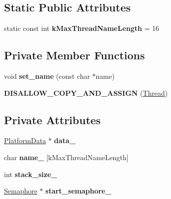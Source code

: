 \subsection*{Static Public Attributes}
\begin{DoxyCompactItemize}
\item 
static const int {\bfseries k\+Max\+Thread\+Name\+Length} = 16\hypertarget{classv8_1_1base_1_1_thread_add5f4a186f3af7d6781fb36847309e7e}{}\label{classv8_1_1base_1_1_thread_add5f4a186f3af7d6781fb36847309e7e}

\end{DoxyCompactItemize}
\subsection*{Private Member Functions}
\begin{DoxyCompactItemize}
\item 
void {\bfseries set\+\_\+name} (const char $\ast$name)\hypertarget{classv8_1_1base_1_1_thread_ac8b3808f8666e627a7b13deebd9eda15}{}\label{classv8_1_1base_1_1_thread_ac8b3808f8666e627a7b13deebd9eda15}

\item 
{\bfseries D\+I\+S\+A\+L\+L\+O\+W\+\_\+\+C\+O\+P\+Y\+\_\+\+A\+N\+D\+\_\+\+A\+S\+S\+I\+GN} (\hyperlink{classv8_1_1base_1_1_thread}{Thread})\hypertarget{classv8_1_1base_1_1_thread_a17fe31da27dc280a422c98c8f8a16e35}{}\label{classv8_1_1base_1_1_thread_a17fe31da27dc280a422c98c8f8a16e35}

\end{DoxyCompactItemize}
\subsection*{Private Attributes}
\begin{DoxyCompactItemize}
\item 
\hyperlink{classv8_1_1base_1_1_thread_1_1_platform_data}{Platform\+Data} $\ast$ {\bfseries data\+\_\+}\hypertarget{classv8_1_1base_1_1_thread_aa6959b4afc8ba7065d97e45327dc54a3}{}\label{classv8_1_1base_1_1_thread_aa6959b4afc8ba7065d97e45327dc54a3}

\item 
char {\bfseries name\+\_\+} \mbox{[}k\+Max\+Thread\+Name\+Length\mbox{]}\hypertarget{classv8_1_1base_1_1_thread_ad7bf55fcc4e796d347c59734708eb81d}{}\label{classv8_1_1base_1_1_thread_ad7bf55fcc4e796d347c59734708eb81d}

\item 
int {\bfseries stack\+\_\+size\+\_\+}\hypertarget{classv8_1_1base_1_1_thread_a223c063a84b4c9aa9a2fd7b01d480fbb}{}\label{classv8_1_1base_1_1_thread_a223c063a84b4c9aa9a2fd7b01d480fbb}

\item 
\hyperlink{classv8_1_1base_1_1_semaphore}{Semaphore} $\ast$ {\bfseries start\+\_\+semaphore\+\_\+}\hypertarget{classv8_1_1base_1_1_thread_a8b55b383de4b22ba6a862264e1bc4b27}{}\label{classv8_1_1base_1_1_thread_a8b55b383de4b22ba6a862264e1bc4b27}

\end{DoxyCompactItemize}


